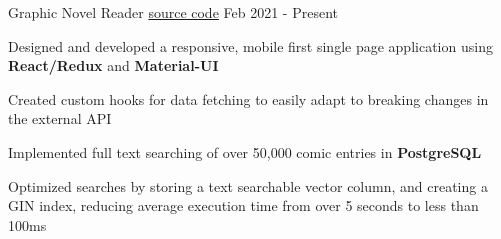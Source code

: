 
\begin{cventries}
  \cventry
    {\fontsize{10pt}{1em}\bodyfont\upshape\color{text}{Front-end comic reading client for the MangaDex API}} %
    {Graphic Novel Reader} %
    {\href{https://github.com/tacticaltofu/mangastack}{source code}} %
    {Feb 2021 - Present} %
    {
      \begin{cvitems} %
        \item {Designed and developed a responsive, mobile first single page application using \textbf{React/Redux} and \textbf{Material-UI}}
        \item {Created custom hooks for data fetching to easily adapt to breaking changes in the external API}
        \item {Implemented full text searching of over 50,000 comic entries in \textbf{PostgreSQL}}
        \item {Optimized searches by storing a text searchable vector column, and creating a GIN index, reducing average execution time from over 5 seconds to less than 100ms}
      \end{cvitems}
    }
\end{cventries}